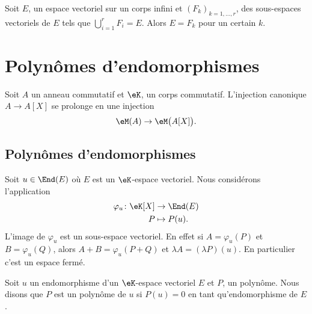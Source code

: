 \begin{proposition}   \label{PropTVKbxU}
    Soit \( E\), un espace vectoriel sur un corps infini et \( (F_k)_{k=1,\ldots, r}\), des sous-espaces vectoriels de \( E\) tels que \( \bigcup_{i=1}^rF_i=E\). Alors \( E=F_k\) pour un certain \( k\).
\end{proposition}

\section{Polynômes d'endomorphismes}
\label{SECooUEQVooLBrRiE}

Soit \( A\) un anneau commutatif et \( \eK\), un corps commutatif. L'injection canonique \( A\to A[X]\) se prolonge en une injection
\begin{equation}
   \eM(A)\to\eM\big( A[X] \big).
\end{equation}

\subsection{Polynômes d'endomorphismes}

Soit \( u\in\End(E)\) où \( E\) est un \( \eK\)-espace vectoriel. Nous considérons l'application
\begin{equation}    \label{EqOVKooeMJuv}
    \begin{aligned}
        \varphi_u\colon \eK[X]&\to \End(E) \\
        P&\mapsto P(u).
    \end{aligned}
\end{equation}
L'image de \( \varphi_u\) est un sous-espace vectoriel. En effet si \( A=\varphi_u(P)\) et \( B=\varphi_u(Q)\), alors \( A+B=\varphi_u(P+Q)\) et \( \lambda A=(\lambda P)(u)\). En particulier c'est un espace fermé.

Soit \( u\) un endomorphisme d'un \( \eK\)-espace vectoriel \( E\) et \( P\), un polynôme. Nous disons que \( P\) est un polynôme  de \( u\) si \( P(u)=0\) en tant qu'endomorphisme de \( E\).

